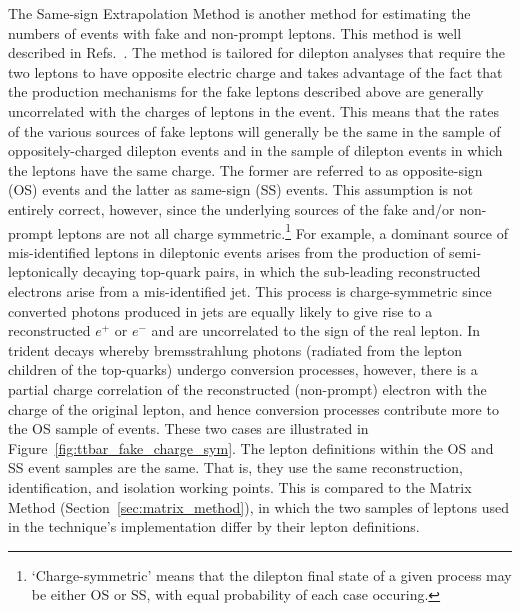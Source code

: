 The Same-sign Extrapolation Method is another method for
estimating the numbers of events with fake and non-prompt leptons.
This method is well described in Refs.~\cite{TOPQ-2015-09,TOPQ-2017-05}.
The method is tailored for dilepton analyses that require the two
leptons to have opposite electric charge and takes advantage of the fact that the
production mechanisms for the fake leptons described above are generally
uncorrelated with the charges of leptons in the event.
This means that the rates of the various sources of fake leptons will generally
be the same in the sample of oppositely-charged dilepton events and in the
sample of dilepton events in which the leptons have the same charge.
The former are referred to as opposite-sign (OS) events and the latter
as same-sign (SS) events.
This assumption is not entirely correct, however, since the underlying sources of
the fake and/or non-prompt leptons are not all charge symmetric.\footnote{`Charge-symmetric' means that the
dilepton final state of a given process may be either OS or SS, with equal probability of each case occuring.}
For example, a dominant source of mis-identified leptons in dileptonic events
arises from the production of semi-leptonically decaying top-quark pairs, in which the sub-leading reconstructed
electrons arise from a mis-identified jet.
This process is charge-symmetric since
converted photons produced in jets are equally likely to give rise to a reconstructed
$e^+$ or $e^-$ and are uncorrelated to the sign of the real lepton.
In trident decays whereby bremsstrahlung photons (radiated from the lepton children
of the top-quarks) undergo conversion processes, however, there is a partial
charge correlation of the reconstructed (non-prompt) electron with the charge of the original lepton,
and hence conversion processes contribute more to the OS sample of events.
These two cases are illustrated in Figure~\ref{fig:ttbar_fake_charge_sym}.
The lepton definitions within the OS and SS event samples are the same.
That is, they use the same reconstruction, identification, and isolation working points.
This is compared to the Matrix Method (Section~\ref{sec:matrix_method}), in which the two samples of leptons used in the technique's
implementation differ by their lepton definitions.

